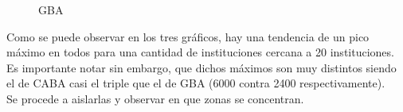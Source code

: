 \documentclass[a4paper, 10pt]{article}
\begin{document}
				\begin{figure}[H]
    				\centering
    				\caption{GBA}
				\end{figure}
																
				
				Como se puede observar en los tres gráficos, hay una tendencia de un pico máximo 
				en todos para una cantidad de instituciones cercana a 20 instituciones. 
				Es importante notar sin embargo, que dichos máximos son muy distintos siendo el 
				de CABA casi el triple que el de GBA (6000 contra 2400 respectivamente).\\
				Se procede a aislarlas y observar en que zonas se concentran.\\
				
\end{document}
